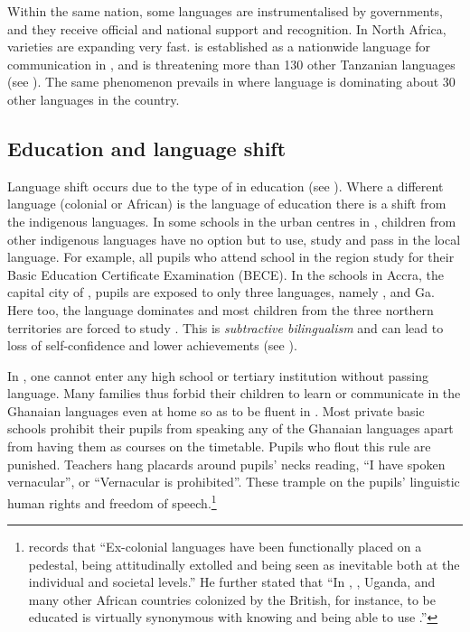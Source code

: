 \documentclass[output=paper,
modfonts
]{langscibook}
\begin{document}
Within the same nation, some languages are instrumentalised by governments, and they receive official and national support and recognition. In North Africa,  varieties are expanding very fast.  is established as a nationwide language for communication in , and is threatening more than 130 other Tanzanian languages (see \citealt[159]{Mous2003}). The same phenomenon prevails in  where  language is dominating about 30 other languages in the country. 

\subsection{Education and language shift}

Language shift occurs due to the type of  in education (see \citealt{Agyekum2009}). Where a different language (colonial or African) is the language of education there is a shift from the indigenous languages. In some schools in the urban centres in , children from other indigenous languages have no option but to use, study and pass in the local language. For example, all pupils who attend school in the  region study   for their Basic Education Certificate Examination (BECE). In the schools in Accra, the capital city of , pupils are exposed to only three languages, namely ,  and Ga. Here too, the  language dominates and most children from the three northern territories are forced to study . This is \textit{subtractive bilingualism} and can lead to loss of self-confidence and lower achievements (see \citealt[9]{Austin2011}). 

In , one cannot enter any high school or tertiary institution without passing  language. Many families thus forbid their children to learn or communicate in the Ghanaian languages even at home so as to be fluent in .  Most private basic schools prohibit their pupils from speaking any of the Ghanaian languages apart from having them as courses on the timetable. Pupils who flout this rule are punished. Teachers hang placards around pupils’ necks reading, “I have spoken vernacular”, or “Vernacular is prohibited”. These trample on the pupils’ linguistic human rights and freedom of speech.\footnote{\citet[285]{Adegbija2001} records that “Ex-colonial languages have been functionally placed on a pedestal, being attitudinally extolled and being seen as inevitable both at the individual and societal levels.” He further stated that “In , , Uganda,  and many other African countries colonized by the British, for instance, to be educated is virtually synonymous with knowing and being able to use .”}{ }
\end{document}

